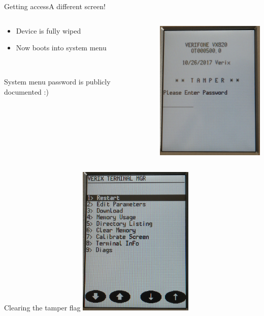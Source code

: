 \documentclass[12pt,aspectratio=169]{beamer}
\begin{document}
\begin{frame}{Getting access}{A different screen!}
\begin{columns}
	\begin{column}{0.5\textwidth}
		\begin{itemize}
			\item Device is fully wiped
			\item Now boots into system menu
		\end{itemize}
		~

		System menu password is publicly documented :)
		\only<2>{\\~\\\textbf{166831}}
	\end{column}
	\begin{column}{0.5\textwidth}
		\centering
		\includegraphics[width=5.5cm]{media/lcd_tamper1}
	\end{column}
\end{columns}
\end{frame}




\begin{frame}{Clearing the tamper flag}
\centering
\includegraphics[width=5.5cm]{media/lcd_tamper2}
\end{frame}
\end{document}
